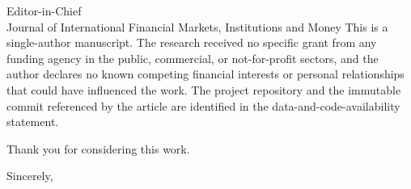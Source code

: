\documentclass[10pt,a4paper]{letter}
\begin{document}
\begin{letter}{Editor-in-Chief\\Journal of International Financial Markets, Institutions and Money}
This is a single-author manuscript. The research received no specific grant from any funding agency in the public, commercial, or not-for-profit sectors, and the author declares no known competing financial interests or personal relationships that could have influenced the work. The project repository and the immutable commit referenced by the article are identified in the data-and-code-availability statement.

Thank you for considering this work.

\closing{Sincerely,}
\end{letter}
\end{document}
